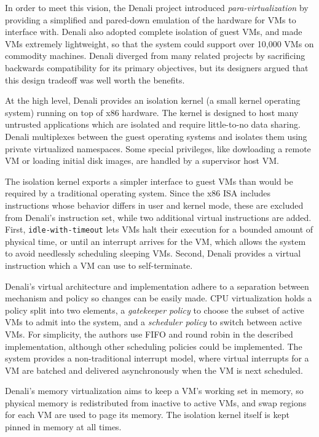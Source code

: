 \documentclass[letterpaper, twocolumn]{article}
\begin{document}
In order to meet this vision, the Denali project introduced \emph{para-virtualization} by providing
a simplified and pared-down emulation of the hardware for VMs to interface with.  Denali also
adopted complete isolation of guest VMs, and made VMs extremely lightweight, so that the system could
support over 10,000 VMs on commodity machines. Denali diverged from many 
related projects by sacrificing backwards compatibility for its primary objectives,
but its designers argued that this design tradeoff was well worth the benefits.

At the high level, Denali provides an isolation kernel (a small kernel operating system) running
on top of x86 hardware. The kernel is designed to host many untrusted applications which are isolated
and require little-to-no data sharing. Denali multiplexes between the guest operating systems and isolates them
using private virtualized namespaces. Some special privileges, like dowloading a remote VM or loading initial
disk images, are handled by a supervisor host VM.

The isolation kernel exports a simpler interface to guest VMs than would be required by a
traditional operating system.  Since the x86 ISA includes instructions whose behavior differs
in user and kernel mode, these are excluded from Denali's instruction set,
while two additional virtual instructions are added.
First, \verb+idle-with-timeout+ lets VMs halt their execution
for a bounded amount of physical time, or until an interrupt arrives for the VM,
which allows the system to avoid needlessly scheduling sleeping VMs.
Second, Denali provides a virtual instruction which a VM can use to self-terminate.

Denali's virtual architecture and implementation adhere to a separation between mechanism and policy 
so changes can be easily made. CPU virtualization holds a policy split into two elements, 
a \emph{gatekeeper policy} to choose the subset of active VMs to admit into the system, and 
a \emph{scheduler policy} to switch between active VMs. For simplicity, the authors use FIFO
and round robin in the described implementation, although other scheduling policies could
be implemented.  The system provides a non-traditional interrupt model, where virtual interrupts
for a VM are batched and delivered asynchronously when the VM is next scheduled.

Denali's memory virtualization aims to keep a VM's working set in memory, so physical memory 
is redistributed from inactive to active VMs, and swap regions for each VM are used to page its memory.
The isolation kernel itself is kept pinned in memory at all times.
\end{document}
